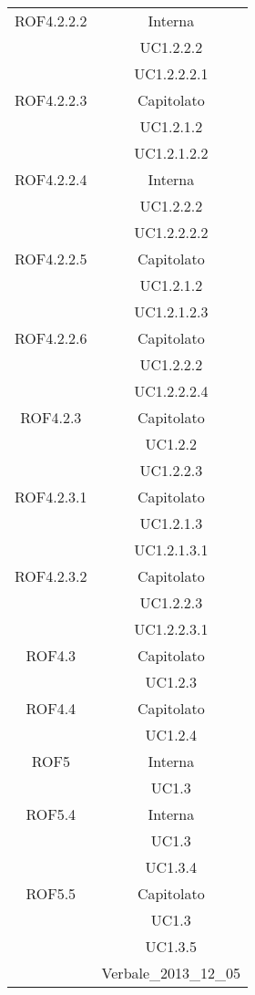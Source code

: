 \begin{longtable}{|c|c|}
\midrule
ROF4.2.2.2
& Interna\\
& UC1.2.2.2\\
& UC1.2.2.2.1\\

\midrule
ROF4.2.2.3
& Capitolato\\
& UC1.2.1.2\\
& UC1.2.1.2.2\\

\midrule
ROF4.2.2.4
& Interna\\
& UC1.2.2.2\\
& UC1.2.2.2.2\\

\midrule
ROF4.2.2.5
& Capitolato\\
& UC1.2.1.2\\
& UC1.2.1.2.3\\

\midrule
ROF4.2.2.6
& Capitolato\\
& UC1.2.2.2\\
& UC1.2.2.2.4\\

\midrule
ROF4.2.3
& Capitolato\\
& UC1.2.2\\
& UC1.2.2.3\\

\midrule
ROF4.2.3.1
& Capitolato\\
& UC1.2.1.3\\
& UC1.2.1.3.1\\

\midrule
ROF4.2.3.2
& Capitolato\\
& UC1.2.2.3\\
& UC1.2.2.3.1\\

\midrule
ROF4.3
& Capitolato\\
& UC1.2.3\\

\midrule
ROF4.4
& Capitolato\\
& UC1.2.4\\

\midrule
ROF5
& Interna\\
& UC1.3\\

\midrule
ROF5.4
& Interna\\
& UC1.3\\
& UC1.3.4\\

\midrule
ROF5.5
& Capitolato\\
& UC1.3\\
& UC1.3.5\\
& Verbale\_2013\_12\_05\\


\end{longtable}
